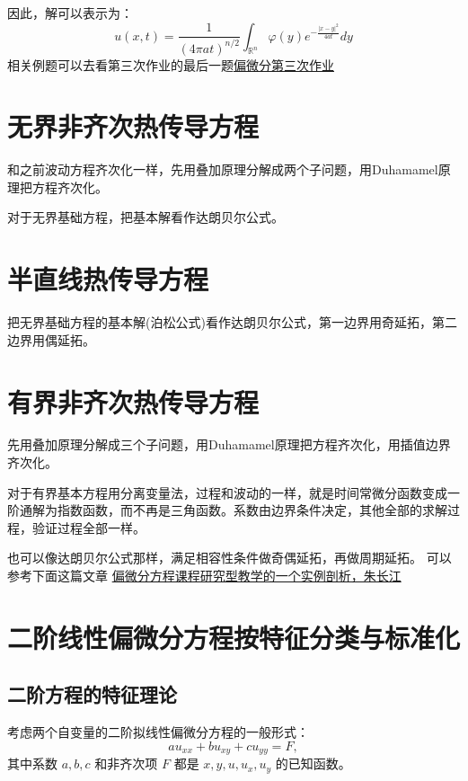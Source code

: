 \documentclass[12pt,a4paper]{article}
\numberwithin{subsection}{section}   %
\numberwithin{subsubsection}{subsection}
\theoremstyle{plain}
\theoremstyle{definition}
\theoremstyle{remark}
\theoremstyle{remark}
\begin{document}
	
	
	
	
	因此，解可以表示为：
	\begin{equation}
		u(x, t) = \frac{1}{(4\pi a t)^{n/2}} \int_{\mathbb{R}^n} \varphi(y) e^{-\frac{|x - y|^2}{4a t}} dy
	\end{equation}
	相关例题可以去看第三次作业的最后一题\href{https://github.com/Albert-Chen04/Partial-differential-equation}{偏微分第三次作业}
	
		\newpage
	\section{无界非齐次热传导方程}
	和之前波动方程齐次化一样，先用叠加原理分解成两个子问题，用Duhamamel原理把方程齐次化。
	
	对于无界基础方程，把基本解看作达朗贝尔公式。
	
	\section{半直线热传导方程}
	把无界基础方程的基本解(泊松公式)看作达朗贝尔公式，第一边界用奇延拓，第二边界用偶延拓。
	
	
	\section{有界非齐次热传导方程}
	先用叠加原理分解成三个子问题，用Duhamamel原理把方程齐次化，用插值边界齐次化。
	
	对于有界基本方程用分离变量法，过程和波动的一样，就是时间常微分函数变成一阶通解为指数函数，而不再是三角函数。系数由边界条件决定，其他全部的求解过程，验证过程全部一样。
	
	也可以像达朗贝尔公式那样，满足相容性条件做奇偶延拓，再做周期延拓。
	可以参考下面这篇文章
\href{https://kns.cnki.net/kcms2/article/abstract?v=VQ0ntgfwFMTzN6hnFDpFMFM9DxAtYwMQhco2QSA-IEHGx9q5EylUyfVfvJ65vLbYgxi4GKWYtrw0WYFjulce4L-QdEJiwrbko6gMtLg1u_v-yZO9l1KqPNK5VVy0WXMK_iyRkdOb_3JYM79j78dC5ZO49R0B00eT_N_tEe4_tT88MKGKuKknjw==&uniplatform=NZKPT&language=CHS}{偏微分方程课程研究型教学的一个实例剖析，朱长江}
		\newpage
	\section{二阶线性偏微分方程按特征分类与标准化}
	\subsection{二阶方程的特征理论}
	考虑两个自变量的二阶拟线性偏微分方程的一般形式：
	\begin{equation}\label{eq:quasi_linear_2nd_order}
		a u_{xx} + b u_{xy} + c u_{yy} = F,
	\end{equation}
	其中系数 \(a, b, c\) 和非齐次项 \(F\) 都是 \(x, y, u, u_x, u_y\) 的已知函数。
	
\end{document}
